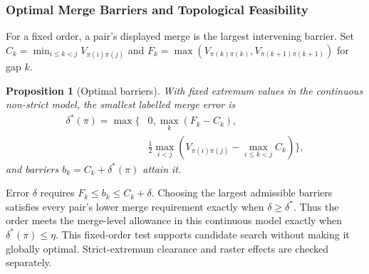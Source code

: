 \documentclass{vgtc}                %
\newtheorem{proposition}{Proposition}
\begin{document}
\subsubsection{Optimal Merge Barriers and Topological Feasibility}
For a fixed order, a pair's displayed merge is the largest intervening barrier. Set $C_k=\min_{i\le k<j}V_{\pi(i)\pi(j)}$ and $F_k=\max(V_{\pi(k)\pi(k)},V_{\pi(k+1)\pi(k+1)})$ for gap $k$.
\begin{proposition}[Optimal barriers]\label{prop:barriers}
With fixed extremum values in the continuous non-strict model, the smallest labelled merge error is
\begin{equation}\label{eq:delta}
\begin{split}
 \delta^*(\pi)=\max\bigg\{&0,\max_k(F_k-C_k),\\
 &\frac12\max_{i<j}\left(V_{\pi(i)\pi(j)}-
                         \max_{i\le k<j}C_k\right)\bigg\},
\end{split}
\end{equation}
and barriers $b_k=C_k+\delta^*(\pi)$ attain it.
\end{proposition}
Error $\delta$ requires $F_k\le b_k\le C_k+\delta$. Choosing the largest admissible barriers satisfies every pair's lower merge requirement exactly when $\delta\ge\delta^*$. Thus the order meets the merge-level allowance in this continuous model exactly when $\delta^*(\pi)\le\eta$. This fixed-order test supports candidate search without making it globally optimal. Strict-extremum clearance and raster effects are checked separately.
\end{document}
